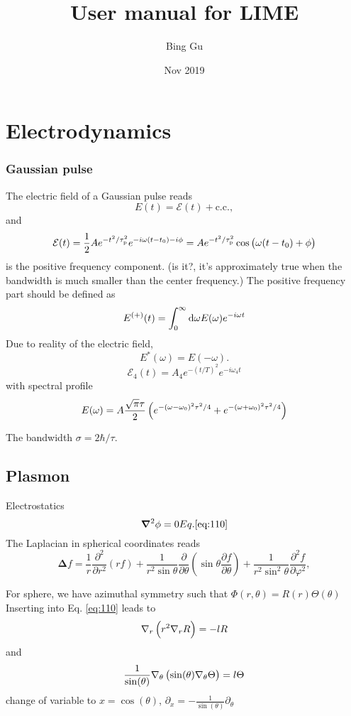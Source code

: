 \documentclass[a4paper,12pt]{book}
\newcommand{\pa}{\partial}
\newcommand{\mc}[1]{\mathcal{#1}}
\newcommand{\eq}[1]{Eq. \eqref{#1}}
\newcommand{\half}{\frac{1}{2}}
\newcommand{\grad}{\nabla}
\renewcommand{\pa}{\partial}
\newcommand{\be}{\begin{equation}}
\newcommand{\ee}{\end{equation}}
\newcommand{\pos}{{(+)}}
\begin{document}
\author{Bing Gu}
\title{User manual for LIME}
\date{Nov 2019}

\frontmatter
\maketitle
\tableofcontents

\mainmatter
%
%


\chapter{Electrodynamics}

\subsection{Gaussian pulse}
The electric field of a Gaussian pulse reads 
\be E(t) = \mc{E}(t) + \text{c.c.}, \ee 
and 
\be \mc{E}(t)  = \half A e^{-t^2/\tau_\text{p}^2} e^{-i\omega (t-t_0) - i \phi} = A e^{-t^2/\tau_\text{p}^2} \cos\del{\omega (t-t_0) + \phi}
\ee 
is the positive frequency component. (is it?, it's approximately true when the bandwidth is much smaller than the center frequency.)
The positive frequency part should be defined as 
\be 
E^\pos(t) = \int_0^\infty \dif \omega E(\omega) e^{-i\omega t} 
\ee 
Due to reality of the electric field, 
\be 
E^*(\omega) = E(-\omega).
\ee 
\be 
\mc{E}_4(t) = A_4 e^{-(t/T)^2} e^{-i\omega_4 t}
\ee 
with spectral profile 
\be 
{E}(\omega) = A\frac{\sqrt{\pi}\tau}{2} \del{ e^{- {(\omega - \omega_0)^2\tau^2/4}} + e^{- {(\omega + \omega_0)^2\tau^2/4}}}
\ee 

The bandwidth $\sigma = 2\hbar/\tau$.  


\section{Plasmon }

Electrostatics
\be
\bm \grad^2 \phi = 0
\eq{eq:110}
\ee
The Laplacian in spherical coordinates reads
\be
\bm \Delta f={\frac {1}{r}}{\frac {\partial ^{2}}{\partial r^{2}}}(rf)+{\frac {1}{r^{2}\sin \theta }}{\frac {\partial }{\partial \theta }}\left(\sin \theta {\frac {\partial f}{\partial \theta }}\right)+{\frac {1}{r^{2}\sin ^{2}\theta }}{\frac {\partial ^{2}f}{\partial \varphi ^{2}}},
\ee

For sphere, we have azimuthal symmetry such that $\Phi(r, \theta) = R(r) \Theta(\theta)$
Inserting into \eq{eq:110} leads to
\be
\grad_r \del{r^2 \grad_r R} = - l R
\ee
and
\be
\frac{1}{\sin(\theta)} \grad_\theta \del{\sin(\theta) \grad_\theta \Theta} = l \Theta
\ee
change of variable to $x = \cos(\theta)$,
$ \pa_x = - \frac{1}{\sin(\theta)} \pa_\theta
$
\end{document}

